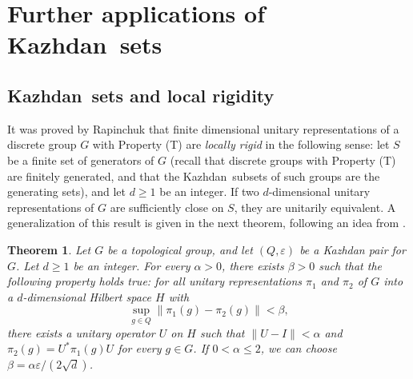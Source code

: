 \documentclass[11pt,english,a4paper]{smfart}
\numberwithin{equation}{section}
\newtheorem{theorem}{Theorem}[section]
\theoremstyle{definition}
\begin{document}
\section{Further applications of {Kazhdan}\ sets}\label{Section 8}
\subsection{{Kazhdan}\ sets and local rigidity}\label{sect:rapinchuk}  
It was proved by Rapinchuk \cite{rapin} that finite dimensional 
unitary representations of a discrete group $G$ with Property (T) are \emph{locally rigid} in the following
sense: let $S$ be a finite set of generators of $G$ (recall that discrete groups with Property (T) are finitely generated, and that the {Kazhdan}\ subsets of such groups are the generating sets), and let $d\ge 1$ be an integer. If two $d$-dimensional unitary representations of $G$ are sufficiently close 
on $S$, they are unitarily equivalent. 
A generalization of this result is given in the next theorem, following an idea from \cite{BOTulam}.
\begin{theorem}\label{thm:rapinchuk}
Let $G$ be a topological group, and let $({Q},\varepsilon)$ be a Kazhdan pair for $G$. Let $d\ge 1$ be an integer. 
For every $\alpha > 0$, there exists $\beta > 0$ such that
the following property holds true: for 
all unitary representations $\pi_1$ and $\pi_2$ of $G$ into a $d$-dimensional Hilbert space $H$ with
$$ \sup_{g\in Q} \|\pi_1(g) - \pi_2(g)\| < \beta ,$$
there exists a unitary operator $U$ on $H$ such that $\|U-I\| < \alpha$ 
and $\pi_2(g) = U^*\pi_1(g)U$ for every $g\in G$. 
If $0<\alpha \le 2$, we can choose $\beta = \alpha \varepsilon/(2\sqrt{d})$.
\end{theorem}
\end{document}
